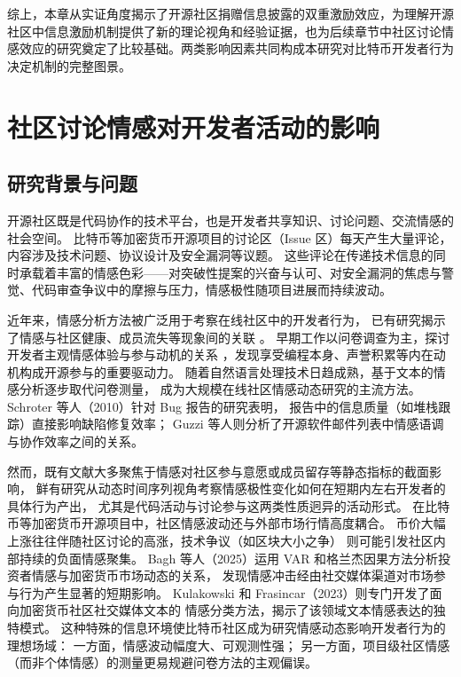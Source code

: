 \documentclass[
    type = master, %
    degree = professional,        %
    decl-page,  %
    twoside,                %
    fontset = fandol %
  ]{njuthesis}
\begin{document}
综上，本章从实证角度揭示了开源社区捐赠信息披露的双重激励效应，为理解开源社区中信息激励机制提供了新的理论视角和经验证据，也为后续章节中社区讨论情感效应的研究奠定了比较基础。两类影响因素共同构成本研究对比特币开发者行为决定机制的完整图景。


\chapter{社区讨论情感对开发者活动的影响}

\section{研究背景与问题}

开源社区既是代码协作的技术平台，也是开发者共享知识、讨论问题、交流情感的社会空间。
比特币等加密货币开源项目的讨论区（Issue 区）每天产生大量评论，内容涉及技术问题、协议设计及安全漏洞等议题。
这些评论在传递技术信息的同时承载着丰富的情感色彩——对突破性提案的兴奋与认可、对安全漏洞的焦虑与警觉、代码审查争议中的摩擦与压力，情感极性随项目进展而持续波动。

近年来，情感分析方法被广泛用于考察在线社区中的开发者行为，
已有研究揭示了情感与社区健康、成员流失等现象间的关联
\cite{yang2021differential,fang2009understanding}。
早期工作以问卷调查为主，探讨开发者主观情感体验与参与动机的关系
\cite{shah2006motivation}，发现享受编程本身、声誉积累等内在动机构成开源参与的重要驱动力。
随着自然语言处理技术日趋成熟，基于文本的情感分析逐步取代问卷测量，
成为大规模在线社区情感动态研究的主流方法\cite{guzzi2013}。
Schroter 等人（2010）针对 Bug 报告的研究表明，
报告中的信息质量（如堆栈跟踪）直接影响缺陷修复效率\cite{schroter2010}；
Guzzi 等人则分析了开源软件邮件列表中情感语调与协作效率之间的关系\cite{guzzi2013}。

然而，既有文献大多聚焦于情感对社区参与意愿或成员留存等静态指标的截面影响，
鲜有研究从动态时间序列视角考察情感极性变化如何在短期内左右开发者的具体行为产出，
尤其是代码活动与讨论参与这两类性质迥异的活动形式。
在比特币等加密货币开源项目中，社区情感波动还与外部市场行情高度耦合。
币价大幅上涨往往伴随社区讨论的高涨，技术争议（如区块大小之争）
则可能引发社区内部持续的负面情感聚集\cite{kobayakawa2020impact}。
Bagh 等人（2025）运用 VAR 和格兰杰因果方法分析投资者情感与加密货币市场动态的关系，
发现情感冲击经由社交媒体渠道对市场参与行为产生显著的短期影响\cite{bagh2025investor}。
Kulakowski 和 Frasincar（2023）则专门开发了面向加密货币社区社交媒体文本的
情感分类方法，揭示了该领域文本情感表达的独特模式\cite{kulakowski2023sentiment}。
这种特殊的信息环境使比特币社区成为研究情感动态影响开发者行为的理想场域：
一方面，情感波动幅度大、可观测性强；
另一方面，项目级社区情感（而非个体情感）的测量更易规避问卷方法的主观偏误。
\end{document}
